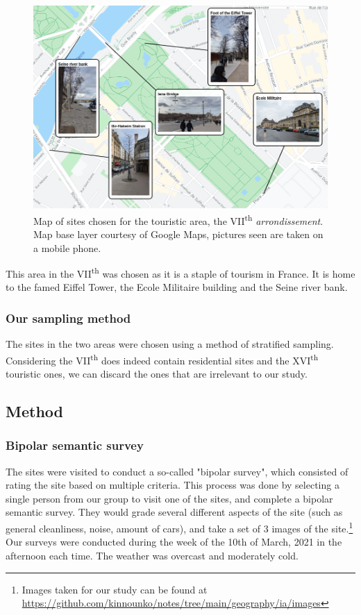 \documentclass[11pt,letterpaper]{article}
\begin{document}
\begin{figure}[H]
    \begin{minipage}{\textwidth}
        \centering
        \includegraphics[width=0.7\linewidth]{media/7esites.png}
        \caption{Map of sites chosen for the touristic area, the VII\textsuperscript{th} \textit{arrondissement}. Map base layer courtesy of Google Maps, pictures seen are taken on a mobile phone.}
    \end{minipage}
\end{figure}

This area in the VII\textsuperscript{th} was chosen as it is a staple of tourism in France. It is home to the famed Eiffel Tower, the Ecole Militaire building and the Seine river bank.

\subsubsection{Our sampling method}

The sites in the two areas were chosen using a method of stratified sampling. Considering the VII\textsuperscript{th} does indeed contain residential sites and the XVI\textsuperscript{th} touristic ones, we can discard the ones that are irrelevant to our study.

\subsection{Method}

\subsubsection{Bipolar semantic survey}

The sites were visited to conduct a so-called "bipolar survey", which consisted of rating the site based on multiple criteria. This process was done by selecting a single person from our group to visit one of the sites, and complete a bipolar semantic survey. They would grade several different aspects of the site (such as general cleanliness, noise, amount of cars), and take a set of 3 images of the site.\footnote{Images taken for our study can be found at \url{https://github.com/kinnounko/notes/tree/main/geography/ia/images}} Our surveys were conducted during the week of the 10th of March, 2021 in the afternoon each time. The weather was overcast and moderately cold.
\end{document}
